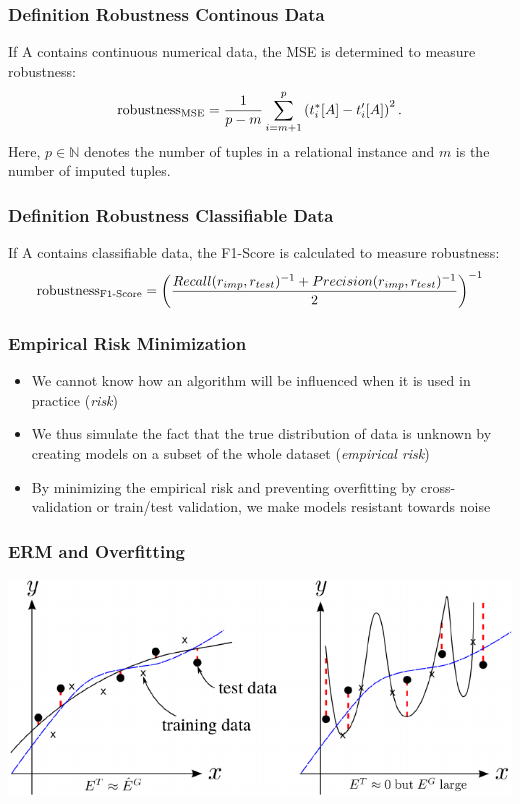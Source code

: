 \documentclass{beamer}
\begin{document}
\begin{frame}
    \frametitle{Definition Robustness Continous Data}
If \textsc{A} contains continuous numerical data, the MSE is determined to measure robustness:
\begin{align}\label{eq:robustness-mse}
    \text{robustness\textsubscript{MSE}} = \frac{1}{p-m}\sum_{i=m+1}^{p} \left(t_{i}^{\ast}[A] - t_{i}^{\prime}[A]\right)^2.
\end{align}
Here, \( p \in \mathbb{N} \) denotes the number of tuples in a relational instance and \( m \) is the number of imputed tuples.
\end{frame}

\begin{frame}
    \frametitle{Definition Robustness Classifiable Data}
    If \textsc{A} contains classifiable data, the F1-Score is calculated to measure robustness:
    \begin{align}\label{eq:robustness-f1-score}
        \text{robustness\textsubscript{F1-Score}} = {\left(\frac{Recall(r_{imp}, r_{test})^{-1} + Precision(r_{imp}, r_{test})^{-1}}{2}\right)}^{-1}
    \end{align}
\end{frame}

\begin{frame}
    \frametitle{Empirical Risk Minimization}
    \begin{itemize}
        \item We cannot know how an algorithm will be influenced when it is used in practice (\emph{risk})
        \item We thus simulate the fact that the true distribution of data is unknown by creating models on a subset of the whole dataset (\emph{empirical risk})
        \item By minimizing the empirical risk and preventing overfitting by cross-validation or train/test validation, we make models resistant towards noise
    \end{itemize}
\end{frame}

\begin{frame}
    \frametitle{ERM and Overfitting}
    \includegraphics[width=\textwidth]{erm-overfitting}
\end{frame}
\end{document}
